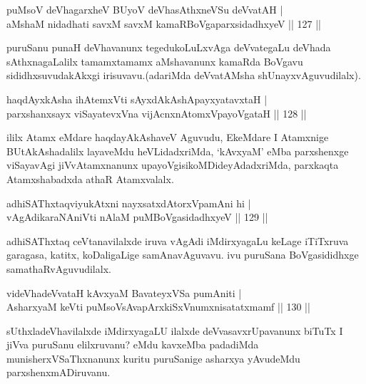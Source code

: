 \begin{shl}
puMsoV deVhagarxheV BUyoV deVhasAthxneVSu deVvatAH |\\
aMshaM nidadhati savxM savxM kamaRBoVgaparxsidadhxyeV \hfill || 127 ||
\end{shl}

\begin{artha}
puruSanu punaH deVhavanunx tegedukoLuLxvAga deVvategaLu deVhada sAthxnagaLalilx tamamxtamamx aMshavanunx kamaRda BoVgavu sididhxsuvudakAkxgi irisuvavu.(adariMda deVvatAMsha shUnayxvAguvudilalx).
\end{artha}


\begin{shl}
haqdAyxkAsha ihA\s \s temxVti sAyxdAkAshApayxyatavxtaH |\\
parxshanxsayx viSayatevxVna vijAcnxnAtomxVpayoVgataH \hfill || 128 ||
\end{shl}

\begin{artha}
ililx Atamx eMdare haqdayAkAshaveV Aguvudu, EkeMdare I Atamxnige BUtAkAshadalilx layaveMdu heVLidadxriMda, `kAvxyaM' eMba parxshenxge viSayavAgi jiVvAtamxnanunx upayoVgisikoMDideyAdadxriMda, parxkaqta Atamxshabadxda athaR Atamxvalalx.
\end{artha}


\begin{shl}
adhiSAThxtaqviyukAtxni nayxsatxdAtorxVpamAni hi |\\
vAgAdikaraNAniVti nAlaM puMBoVgasidadhxyeV \hfill || 129 ||
\end{shl}

\begin{artha}
adhiSAThxtaq ceVtanavilalxde iruva vAgAdi iMdirxyagaLu keLage iTiTxruva garagasa, katitx, koDaligaLige samAnavAguvavu.  ivu puruSana BoVgasididhxge samathaRvAguvudilalx.
\end{artha}


\begin{shl}
videVhadeVvataH kAvxyaM BavateyxVSa pumAniti |\\
AsharxyaM keVti puMsoV\s sAvapArxkiSxVnumxnisatatxmamf \hfill || 130 ||
\end{shl}

\begin{artha}
sUthxladeVhavilalxde iMdirxyagaLU ilalxde deVvasavxrUpavanunx biTuTx I jiVva puruSanu elilxruvanu? eMdu kavxeMba padadiMda munisherxVSaThxnanunx kuritu puruSanige asharxya yAvudeMdu parxshenxmADiruvanu.
\end{artha}

